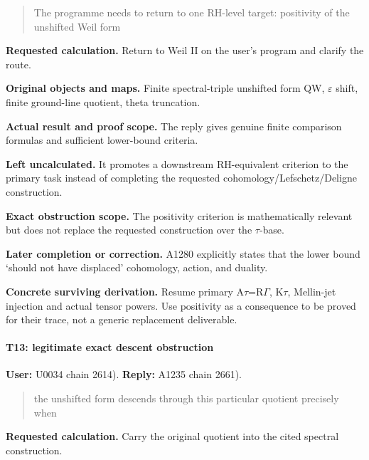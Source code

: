 \begin{quote}
The programme needs to return to one RH-level target: positivity of the
unshifted Weil form
\end{quote}

\textbf{Requested calculation.} Return to Weil II on the user's program
and clarify the route.

\textbf{Original objects and maps.} Finite spectral-triple unshifted
form QW, \allowbreak{}\ensuremath{ε}\allowbreak{} shift, finite
ground-line quotient, theta truncation.

\textbf{Actual result and proof scope.} The reply gives genuine finite
comparison formulas and sufficient lower-bound criteria.

\textbf{Left uncalculated.} It promotes a downstream RH-equivalent
criterion to the primary task instead of completing the requested
cohomology/Lefschetz/Deligne construction.

\textbf{Exact obstruction scope.} The positivity criterion is
mathematically relevant but does not replace the requested construction
over the \allowbreak{}\ensuremath{τ}\allowbreak{}-base.

\textbf{Later completion or correction.} A1280 explicitly states that
the lower bound `should not have displaced' cohomology, action, and
duality.

\textbf{Concrete surviving derivation.} Resume primary
A\allowbreak{}\ensuremath{τ}\allowbreak{}=R\allowbreak{}\ensuremath{Γ}\allowbreak{},
K\allowbreak{}\ensuremath{τ}\allowbreak{}, Mellin-jet injection and
actual tensor powers. Use positivity as a consequence to be proved for
their trace, not a generic replacement deliverable.

\paragraph{T13: legitimate exact descent
obstruction}\label{t13-legitimate-exact-descent-obstruction}

\textbf{User:} U0034
\protect{} chain 2614).
\textbf{Reply:} A1235
\protect{} chain 2661).

\begin{quote}
the unshifted form descends through this particular quotient precisely
when
\end{quote}

\textbf{Requested calculation.} Carry the original quotient into the
cited spectral construction.


